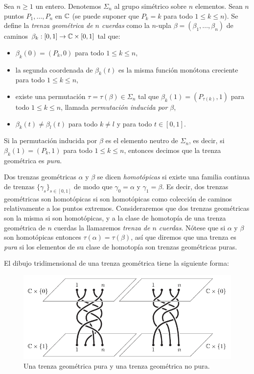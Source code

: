 \documentclass[TFG.tex]{subfiles}
\begin{document}
\begin{defi}\label{geo}
Sea $n\geq 1$ un entero. Denotemos $\Sigma_n$ al grupo simétrico sobre $n$ elementos. Sean $n$ puntos $P_1,\dots, P_n$ en $\mathbb{C}$ (se puede suponer que $P_k=k$ para todo $1\leq k\leq n$). Se define la \emph{trenza geométrica de $n$ cuerdas} como la $n$-upla $\beta=(\beta_1,\dots,\beta_n)$ de caminos $\beta_k:[0,1]\to\mathbb{C}\times[0,1]$ tal que:
\begin{itemize}
\item $\beta_k(0)=(P_k,0)$ para todo $1\leq k\leq n$,
\item la segunda coordenada de $\beta_k(t)$ es la misma función monótona creciente para todo $1\leq k\leq n$, 
\item existe una permutación $\tau=\tau(\beta)\in\Sigma_n$ tal que $\beta_k(1)=(P_{\tau(k)},1)$ para todo $1\leq k\leq n$, llamada \emph{permutación inducida por $\beta$},
\item $\beta_k(t)\neq \beta_l(t)$ para todo $k\neq l$ y para todo $t\in[0,1]$.
\end{itemize}
Si la permutación inducida por $\beta$ es el elemento neutro de $\Sigma_n$, es decir, si $\beta_k(1)=(P_k,1)$ para todo $1\leq k\leq n$, entonces decimos que la trenza geométrica es \emph{pura}.

Dos trenzas geométricas $\alpha$ y $\beta$ se dicen \emph{homotópicas} si existe una familia continua de trenzas $\{\gamma_s\}_{s\in[0,1]}$ de modo que $\gamma_0=\alpha$ y $\gamma_1=\beta$. Es decir, dos trenzas geométricas son homotópicas si son homotópicas como colección de caminos relativamente a los puntos extremos. Consideraremos que dos trenzas geométricas son la misma si son homotópicas, y a la clase de homotopía de una trenza geométrica de $n$ cuerdas la llamaremos \emph{trenza de $n$ cuerdas}. Nótese que si $\alpha$ y $\beta$ son homotópicas entonces $\tau(\alpha)=\tau(\beta)$, así que diremos que una trenza es \emph{pura} si los elementos de su clase de homotopía son trenzas geométricas puras.
\end{defi}

El dibujo tridimensional de una trenza geométrica tiene la siguiente forma:
\begin{figure}[h!]
\includegraphics[scale=0.7]{Imagenes/hilos}
\caption{Una trenza geométrica pura y una trenza geométrica no pura.}\label{hilos}
\end{figure}
\end{document}
